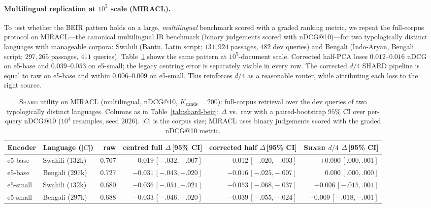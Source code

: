\documentclass[11pt,a4paper]{article}
\begin{document}
\paragraph{Multilingual replication at $10^5$ scale (MIRACL).}
To test whether the BEIR pattern holds on a large, \emph{multilingual}
benchmark scored with a graded ranking metric, we repeat the full-corpus
protocol on MIRACL---the canonical multilingual IR benchmark (binary
judgements scored with nDCG@10)---for two typologically distinct languages
with manageable corpora: Swahili (Bantu, Latin script; $131{,}924$ passages,
$482$ dev queries) and Bengali (Indo-Aryan, Bengali script; $297{,}265$
passages, $411$ queries). Table~\ref{tab:shard-miracl} shows the same
pattern at $10^5$-document scale. Corrected half-PCA loses $0.012$--$0.016$
nDCG on e5-base and $0.039$--$0.053$ on e5-small; the legacy centring error
is separately visible in every row. The corrected $d/4$ SHARD pipeline is
equal to raw on e5-base and within $0.006$--$0.009$ on e5-small. This
reinforces $d/4$ as a reasonable router, while attributing each loss to the
right source.

\begin{table}[tbp]
\centering
\caption{\textsc{Shard} utility on MIRACL (multilingual, nDCG@10,
$K_{\mathrm{cands}}{=}200$): full-corpus retrieval over the dev queries of two
typologically distinct languages. Columns as in Table~\ref{tab:shard-beir}:
$\Delta$ vs.\ raw with a paired-bootstrap $95\%$ CI over per-query nDCG@10
($10^4$ resamples, seed $2026$). $|C|$ is the corpus size; MIRACL uses binary
judgements scored with the graded nDCG@10 metric.}
\label{tab:shard-miracl}
\scriptsize
\setlength{\tabcolsep}{4pt}
\begin{tabular}{@{}llrrrr@{}}
\toprule
Encoder & Language ($|C|$) & raw & centred full $\Delta$\,[95\% CI] & corrected half $\Delta$\,[95\% CI] & \textsc{Shard} $d/4$ $\Delta$\,[95\% CI]\\
\midrule
e5-base  & Swahili ($132$k) & $0.707$ & $-0.019\,[{-}.032,{-}.007]$ & $-0.012\,[{-}.020,{-}.003]$ & $\mathbf{+0.000\,[.000,.001]}$\\
e5-base  & Bengali ($297$k) & $0.727$ & $-0.031\,[{-}.043,{-}.020]$ & $-0.016\,[{-}.025,{-}.007]$ & $\mathbf{0.000\,[.000,.000]}$\\
e5-small & Swahili ($132$k) & $0.680$ & $-0.036\,[{-}.051,{-}.021]$ & $-0.053\,[{-}.068,{-}.037]$ & $\mathbf{-0.006\,[{-}.015,.001]}$\\
e5-small & Bengali ($297$k) & $0.688$ & $-0.033\,[{-}.046,{-}.020]$ & $-0.039\,[{-}.055,{-}.024]$ & $\mathbf{-0.009\,[{-}.018,{-}.001]}$\\
\bottomrule
\end{tabular}
\end{table}
\end{document}
